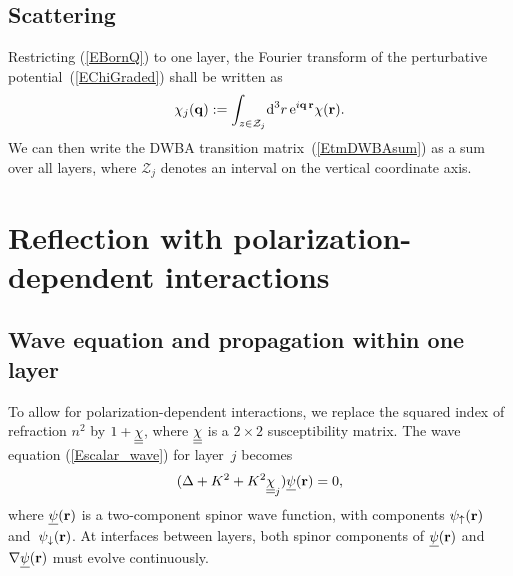 \subsection{Scattering}
Restricting (\ref{EBornQ}) to one layer,
the Fourier transform
of the perturbative potential~(\ref{EChiGraded})
shall be written as
\begin{equation}\label{Echij}
  \chi_j(\mathbf{q})
  := \int_{z\in\mathcal{Z}_j}\!\text{d}^3r\, \text{e}^{i\mathbf{q}\,\mathbf{r}}\chi(\mathbf{r}).
\end{equation}
%
We can then write the DWBA transition matrix~(\ref{EtmDWBAsum}) as
a sum over all layers,
%
where
$\mathcal{Z}_j$ denotes an interval on the vertical coordinate axis.




\section{Reflection with polarization-dependent interactions}\label{s:pol}


\subsection{Wave equation and propagation within one layer}

To allow for polarization-dependent interactions,
we replace the squared index of refraction $n^2$
by $1+\underline{\underline{\chi}}$, where $\underline{\underline{\chi}}$ is a $2\times 2$ susceptibility matrix.
The wave equation (\ref{Escalar_wave}) for layer~$j$ becomes
\begin{equation}\label{Ewaveqp}  
(\Delta +K^2 +K^2 \underline{\underline{\chi}}_j) \underline{\psi}(\mathbf{r})= 0,
\end{equation}
where $\underline{\psi}(\mathbf{r})$ is a two-component spinor wave function,
with components $\psi_\uparrow(\mathbf{r})$ and~$\psi_\downarrow(\mathbf{r})$.
At interfaces between layers,
both spinor components of $\underline{\psi}(\mathbf{r})$ and $\mathbf{\nabla}\underline{\psi}(\mathbf{r})$
must evolve continuously.

